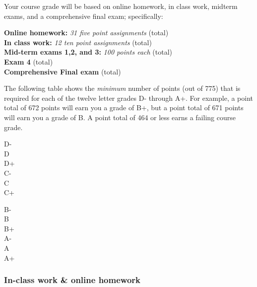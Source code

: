 \documentclass[12pt]{article}
\newcounter{ex}\setcounter{ex}{0}
\newenvironment{mypar}[2]
  {\begin{list}{}%
    {\setlength\leftmargin{#1}
    \setlength\rightmargin{#2}}
    \item[]}
  {\end{list}}
\begin{document}
Your course grade will be based on online homework, in class work, midterm exams, and a comprehensive 
final exam; specifically:
\begin{mypar}{0.25in}{0.25in}
    \textbf{Online homework:} \emph{31 five point assignments}  (total)\\
    \textbf{In class work:}  \emph{12 ten point assignments}   (total) \\
    \textbf{Mid-term exams 1,2, and 3:} \emph{100 points each}  (total)\\
    \textbf{Exam 4}  (total)\\
    \textbf{Comprehensive Final exam}  (total)\\
\end{mypar}
\noindent The following table shows the \emph{minimum} number of points (out of 775) that
is required for each of the twelve letter grades D- through A+. For
example, a point total of 672 points will earn you a grade of B+, but
a point total of 671 points will earn you a grade of B. A point
total of 464 or less earns a failing course grade.

\begin{mypar}{0.25in}{0.25in}
    \begin{minipage}{2.5in}
        D-    \\
        D  \\
        D+  \\
        C-  \\
        C  \\
        C+  
    \end{minipage}
    \phantom{xxx}
    \begin{minipage}{2.5in}
        B-  \\
        B  \\
        B+  \\
        A-  \\
        A  \\
        A+  
    \end{minipage}
\end{mypar} 

\subsubsection*{In-class work \& online homework}
\end{document}
